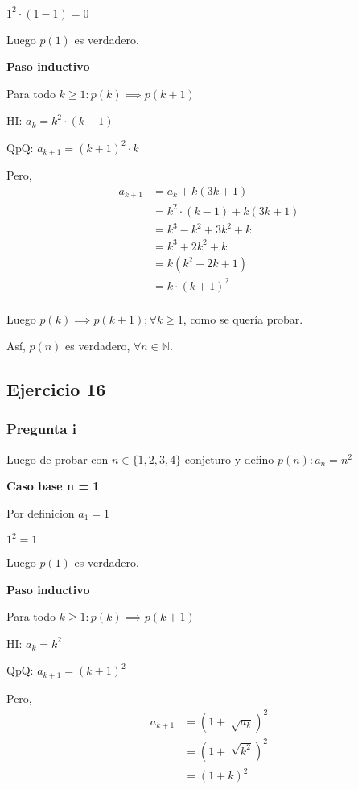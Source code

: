 $ 1^2\cdot (1-1) = 0 $

Luego $ p(1) $ es verdadero.

\textbf{Paso inductivo}

Para todo $k \geq 1: p(k) \implies p(k+1)$

HI: $ a_k = k^2\cdot (k-1)$

QpQ: $ a_{k+1} = (k+1)^2\cdot k$

Pero,
\begin{align*}
    a_{k+1} &= a_k + k(3k+1) \\
    &= k^2\cdot (k-1) + k(3k+1) \\
    &= k^3 - k^2 + 3k^2+k \\
    &= k^3 +2k^2+k \\
    &= k(k^2 + 2k + 1)\\
    &= k\cdot (k+1)^2\\
\end{align*}

Luego $p(k) \implies p(k+1); \forall k \geq 1$, como se quería probar.

Así, $p(n)$ es verdadero, $\forall n \in \mathbb{N}$.

\subsection{Ejercicio 16}

\subsubsection{Pregunta i}

Luego de probar con $ n \in \{ 1,2,3,4 \} $ conjeturo y defino $ p(n): a_n = n^2 $

\textbf{Caso base n = 1}

Por definicion $ a_1 = 1$

$ 1^2 = 1$

Luego $ p(1) $ es verdadero.

\textbf{Paso inductivo}

Para todo $k \geq 1: p(k) \implies p(k+1)$

HI: $ a_k = k^2$

QpQ: $ a_{k+1} = (k+1)^2$

Pero,
\begin{align*}
    a_{k+1} &= (1+\sqrt[]{a_k})^2 \\
    &= (1+\sqrt[]{k^2})^2 \\
    &= (1+k)^2 \\
\end{align*}

